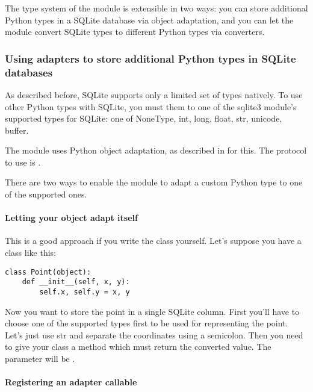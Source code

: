 The type system of the  module is extensible in two ways: you can store
additional Python types in a SQLite database via object adaptation, and you can
let the  module convert SQLite types to different Python types via
converters.

\subsubsection{Using adapters to store additional Python types in SQLite databases}

As described before, SQLite supports only a limited set of types natively. To
use other Python types with SQLite, you must  them to one of the sqlite3
module's supported types for SQLite: one of NoneType, int, long, float,
str, unicode, buffer.

The  module uses Python object adaptation, as described in  for this.  The protocol to use is .

There are two ways to enable the  module to adapt a custom Python type
to one of the supported ones.

\paragraph{Letting your object adapt itself}

This is a good approach if you write the class yourself. Let's suppose you have
a class like this:

\begin{verbatim}
class Point(object):
    def __init__(self, x, y):
        self.x, self.y = x, y
\end{verbatim}

Now you want to store the point in a single SQLite column.  First you'll have to
choose one of the supported types first to be used for representing the point.
Let's just use str and separate the coordinates using a semicolon. Then you
need to give your class a method  which must
return the converted value. The parameter  will be
.



\paragraph{Registering an adapter callable}

